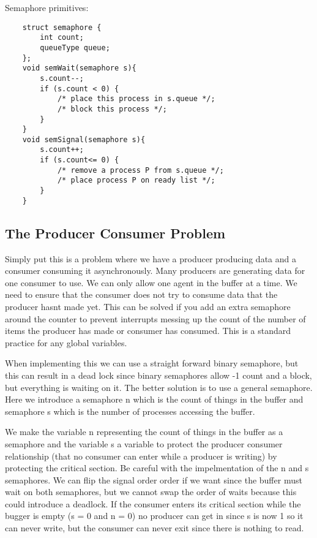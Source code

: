 \documentclass[12pt]{article}
\begin{document}
Semaphore primitives:
\begin{lstlisting}
    struct semaphore {
        int count;
        queueType queue;
    };
    void semWait(semaphore s){
        s.count--;
        if (s.count < 0) {
            /* place this process in s.queue */;
            /* block this process */;
        }
    }
    void semSignal(semaphore s){
        s.count++;
        if (s.count<= 0) {
            /* remove a process P from s.queue */;
            /* place process P on ready list */;
        }
    }
\end{lstlisting}

\subsection{The Producer Consumer Problem}
Simply put this is a problem where we have a producer producing data and a consumer consuming it asynchronously. Many producers are generating data for one consumer to use. We can only allow one agent in the buffer at a time. We need to ensure that the consumer does not try to consume data that the producer hasnt made yet. This can be solved if you add an extra semaphore around the counter to prevent interrupts messing up the count of the number of items the producer has made or consumer has consumed. This is a standard practice for any global variables.

When implementing this we can use a straight forward binary semaphore, but this can result in a dead lock since binary semaphores allow -1 count and a block, but everything is waiting on it. The better solution is to use a general semaphore. Here we introduce a semaphore n which is the count of things in the buffer and semaphore s which is the number of processes accessing the buffer.

We make the variable n representing the count of things in the buffer as a semaphore and the variable s a variable to protect the producer consumer relationship (that no consumer can enter while a producer is writing) by protecting the critical section. Be careful with the impelmentation of the n and s semaphores. We can flip the signal order order if we want since the buffer must wait on both semaphores, but we cannot swap the order of waits because this could introduce a deadlock. If the consumer enters its critical section while the bugger is empty (s = 0 and n = 0) no producer can get in since s is now 1 so it can never write, but the consumer can never exit since there is nothing to read.
\end{document}
